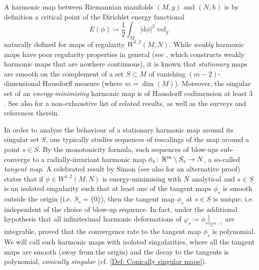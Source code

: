 \documentclass{article}
\numberwithin{equation}{section}        %
\theoremstyle{bfnote}
\theoremstyle{definition}
\theoremstyle{bfremark}
\newcommand{\col}{\colon \thinspace}        %
\newcommand{\Sp}{\mathbb{S}}                %
\newcommand{\diff}{\mathrm{d}}                      %
\DeclareMathOperator{\vol}{vol}                 %
\begin{document}
A harmonic map between Riemannian manifolds $(M,g)$ and $(N,h)$ is by definition a critical point of the Dirichlet energy functional
\begin{equation*}
    E(\phi) \coloneqq \frac{1}{2} \int_M \vert \diff \phi \vert^2 \vol_g
\end{equation*}
naturally defined for maps of regularity $W^{1,2}(M,N)$. While \emph{weakly} harmonic maps have poor regularity properties in general (see \cite{Riviere1992DiscontHarmonicMaps}, which constructs weakly harmonic maps that are nowhere continuous), it is known that \emph{stationary} maps are smooth on the complement of a set $S\subset M$ of vanishing $(m-2)$-dimensional Hausdorff measure \cite{Bethuel1993Regularity,Evans1991Regularity} (where $m= \dim(M)$). Moreover, the singular set of an \emph{energy-minimising} harmonic map is of Hausdorff codimension at least 3 \cite{SchoenUhlenbeck1982RegularityHarmonicMaps}. See also \cite{chang1999regularity,chanillo1991sobolev,lin1999gradient,Naber2017RegularityHarmonicMaps,riviere2007partial} for a non-exhaustive list of related results, as well as the surveys \cite{hardt1997singularities,helein2007harmonic} and references therein.

In order to analyse the behaviour of a stationary harmonic map around its singular set $S$, one typically studies sequences of rescalings of the map around a point $s \in S$. By the monotonicity formula, such sequences of blow-ups sub-converge to a radially-invariant harmonic map $\phi_{s} \col \mathbb{R}^m\setminus S_s \to N$, a so-called \emph{tangent map}. A celebrated result by Simon \cite{simon1983asymptotics,simon1993theorems} (see also \cite{CaniatoParise2025logepiperimetric} for an alternative proof) states that if $\phi\in W^{1,2}(M,N)$ is energy-minimising with $N$ analytical and $s \in S$ is an isolated singularity such that at least one of the tangent maps $\phi_s$ is smooth outside the origin (i.e. $S_s=\{0\}$), then the tangent map $\phi_s$ at $s \in S$ is unique, i.e. independent of the choice of blow-up sequence. In fact, under the additional hypothesis that all infinitesimal harmonic deformations of $\varphi_s \coloneqq \left. \phi_s \right|_{\Sp^{m-1}}$ are integrable, \cite{adams1988rates} proved that the convergence rate to the tangent map $\phi_s$ is polynomial. We will call such harmonic maps with isolated singularities, where all the tangent maps are smooth (away from the origin) and the decay to the tangents is polynomial, \emph{conically singular} (cf. \cref{Def: Conically singular maps}).
\end{document}
